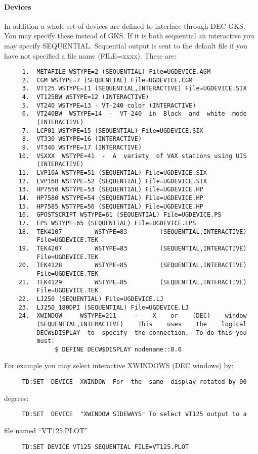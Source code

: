 \paragraph{Devices}
In addition a whole set of devices are defined to interface through
DEC GKS.  You may specify these instead of  GKS.   If  it  is  both
sequential  an  interactive you may specify SEQUENTIAL.  Sequential
output is sent to the default file if you have not specified a file
name (FILE=xxxx).  These are:  
\begin{verbatim}
     1.  METAFILE WSTYPE=2 (SEQUENTIAL) File=UGDEVICE.AGM 
     2.  CGM WSTYPE=7 (SEQUENTIAL) File=UGDEVICE.CGM 
     3.  VT125 WSTYPE=11 (SEQUENTIAL,INTERACTIVE) File=UGDEVICE.SIX 
     4.  VT125BW WSTYPE=12 (INTERACTIVE) 
     5.  VT240 WSTYPE=13 - VT-240 color (INTERACTIVE) 
     6.  VT240BW  WSTYPE=14  -  VT-240  in  Black  and  white  mode
         (INTERACTIVE) 
     7.  LCP01 WSTYPE=15 (SEQUENTIAL) File=UGDEVICE.SIX 
     8.  VT330 WSTYPE=16 (INTERACTIVE) 
     9.  VT340 WSTYPE=17 (INTERACTIVE) 
    10.  VSXXX  WSTYPE=41  -  A  variety  of VAX stations using UIS
         (INTERACTIVE) 
    11.  LVP16A WSTYPE=51 (SEQUENTIAL) File=UGDEVICE.SIX 
    12.  LVP16B WSTYPE=52 (SEQUENTIAL) File=UGDEVICE.SIX 
    13.  HP7550 WSTYPE=53 (SEQUENTIAL) File=UGDEVICE.HP 
    14.  HP7580 WSTYPE=54 (SEQUENTIAL) File=UGDEVICE.HP 
    15.  HP7585 WSTYPE=56 (SEQUENTIAL) File=UGDEVICE.HP 
    16.  GPOSTSCRIPT WSTYPE=61 (SEQUENTIAL) File=UGDEVICE.PS 
    17.  EPS WSTYPE=65 (SEQUENTIAL) File=UGDEVICE.EPS 
    18.  TEK4107         WSTYPE=83         (SEQUENTIAL,INTERACTIVE)
         File=UGDEVICE.TEK 
    19.  TEK4207         WSTYPE=83         (SEQUENTIAL,INTERACTIVE)
         File=UGDEVICE.TEK 
    20.  TEK4128         WSTYPE=85         (SEQUENTIAL,INTERACTIVE)
         File=UGDEVICE.TEK 
    21.  TEK4129         WSTYPE=85         (SEQUENTIAL,INTERACTIVE)
         File=UGDEVICE.TEK 
    22.  LJ250 (SEQUENTIAL) File=UGDEVICE.LJ 
    23.  LJ250_180DPI (SEQUENTIAL) File=UGDEVICE.LJ 
    24.  XWINDOW     WSTYPE=211     -    X    or    (DEC)    window
         (SEQUENTIAL,INTERACTIVE)    This    uses    the    logical
         DECW$DISPLAY  to  specify  the connection.  To do this you
         must:  
              $ DEFINE DECW$DISPLAY nodename::0.0 
\end{verbatim}
For example you may select interactive XWINDOWS (DEC windows) by:  
\begin{verbatim}
     TD:SET  DEVICE  XWINDOW  For  the  same  display rotated by 90
\end{verbatim}
degrees:  
\begin{verbatim}
     TD:SET  DEVICE  "XWINDOW SIDEWAYS" To select VT125 output to a
\end{verbatim}
file named ``VT125.PLOT'' 
\begin{verbatim}
     TD:SET DEVICE VT125 SEQUENTIAL FILE=VT125.PLOT 
\end{verbatim}

